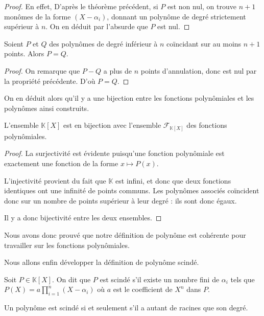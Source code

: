 \begin{proof}
    En effet, D'après le théorème précédent, si $P$ est non nul, on trouve $n+1$ monômes de la forme $(X-\alpha_i)$, donnant un polynôme de degré strictement supérieur à $n$. On en déduit par l'absurde que $P$ est nul.
\end{proof}

\begin{prop}
    Soient $P$ et $Q$ des polynômes de degré inférieur à $n$ coïncidant sur au moins $n+1$ points. Alors $P=Q$.
\end{prop}
\begin{proof}
    On remarque que $P-Q$ a plus de $n$ points d'annulation, donc est nul par la propriété précédente. D'où $P=Q$.
\end{proof}

On en déduit alors qu'il y a une bijection entre les fonctions polynômiales et les polynômes ainsi construits.

\begin{them}
    L'ensemble $\mathbb K[X]$ est en bijection avec l'ensemble $\mathcal F_{\mathbb K[X]}$ des fonctions polynômiales.
\end{them}
\begin{proof}
    La surjectivité est évidente puisqu'une fonction polynômiale est exactement une fonction de la forme $x\mapsto P(x)$.
    
    L'injectivité provient du fait que $\mathbb K$ est infini, et donc que deux fonctions identiques ont une infinité de points communs. Les polynômes associés coïncident donc sur un nombre de points supérieur à leur degré : ils sont donc égaux.
    
    Il y a donc bijectivité entre les deux ensembles.
\end{proof}

Nous avons donc prouvé que notre définition de polynôme est cohérente pour travailler sur les fonctions polynômiales.

Nous allons enfin développer la définition de polynôme scindé.

\begin{defi}
    Soit $P\in\mathbb K[X]$. On dit que $P$ est scindé s'il existe un nombre fini de $\alpha_i$ tels que $P(X)=a\prod_{i=1}^n(X-\alpha_i)$ où $a$ est le coefficient de $X^n$ dans $P$.
\end{defi}

\begin{rmk}
    Un polynôme est scindé si et seulement s'il a autant de racines que son degré.
\end{rmk}

